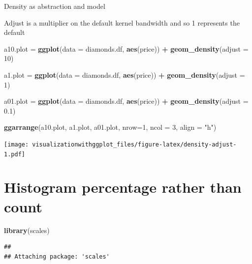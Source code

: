 \documentclass[]{krantz}
\makeatletter
\newenvironment{Shaded}{\begin{snugshade}}{\end{snugshade}}
\newcommand{\DataTypeTok}[1]{\textcolor[rgb]{0.13,0.29,0.53}{#1}}
\newcommand{\DecValTok}[1]{\textcolor[rgb]{0.00,0.00,0.81}{#1}}
\newcommand{\FloatTok}[1]{\textcolor[rgb]{0.00,0.00,0.81}{#1}}
\newcommand{\KeywordTok}[1]{\textcolor[rgb]{0.13,0.29,0.53}{\textbf{#1}}}
\newcommand{\NormalTok}[1]{#1}
\newcommand{\OperatorTok}[1]{\textcolor[rgb]{0.81,0.36,0.00}{\textbf{#1}}}
\newcommand{\StringTok}[1]{\textcolor[rgb]{0.31,0.60,0.02}{#1}}
\newenvironment{kframe}{%
\medskip{}
\setlength{\fboxsep}{.8em}
 \def\at@end@of@kframe{}%
 \ifinner\ifhmode%
  \def\at@end@of@kframe{\end{minipage}}%
  \begin{minipage}{\columnwidth}%
 \fi\fi%
 \def\FrameCommand##1{\hskip\@totalleftmargin \hskip-\fboxsep
 \colorbox{shadecolor}{##1}\hskip-\fboxsep
     \hskip-\linewidth \hskip-\@totalleftmargin \hskip\columnwidth}%
 \MakeFramed {\advance\hsize-\width
   \@totalleftmargin\z@ \linewidth\hsize
   \@setminipage}}%
 {\par\unskip\endMakeFramed%
 \at@end@of@kframe}
\renewenvironment{Shaded}{\begin{kframe}}{\end{kframe}}
\makeatother
\begin{document}
Density as abstraction and model

Adjust is a multiplier on the default kernel bandwidth and so 1 represents the default

\begin{Shaded}
\begin{Highlighting}[]
\NormalTok{a10.plot =}\StringTok{ }\KeywordTok{ggplot}\NormalTok{(}\DataTypeTok{data =}\NormalTok{ diamonds.df, }\KeywordTok{aes}\NormalTok{(price)) }\OperatorTok{+}\StringTok{ }
\StringTok{  }\KeywordTok{geom_density}\NormalTok{(}\DataTypeTok{adjust =} \DecValTok{10}\NormalTok{) }

\NormalTok{a1.plot =}\StringTok{ }\KeywordTok{ggplot}\NormalTok{(}\DataTypeTok{data =}\NormalTok{ diamonds.df, }\KeywordTok{aes}\NormalTok{(price)) }\OperatorTok{+}\StringTok{ }
\StringTok{  }\KeywordTok{geom_density}\NormalTok{(}\DataTypeTok{adjust =} \DecValTok{1}\NormalTok{) }

\NormalTok{a01.plot =}\StringTok{ }\KeywordTok{ggplot}\NormalTok{(}\DataTypeTok{data =}\NormalTok{ diamonds.df, }\KeywordTok{aes}\NormalTok{(price)) }\OperatorTok{+}\StringTok{ }
\StringTok{  }\KeywordTok{geom_density}\NormalTok{(}\DataTypeTok{adjust  =} \FloatTok{0.1}\NormalTok{) }

\KeywordTok{ggarrange}\NormalTok{(a10.plot, a1.plot, a01.plot,}
    \DataTypeTok{nrow=}\DecValTok{1}\NormalTok{, }\DataTypeTok{ncol =} \DecValTok{3}\NormalTok{, }\DataTypeTok{align =} \StringTok{"h"}\NormalTok{)}
\end{Highlighting}
\end{Shaded}

\texttt{[image: visualizationwithggplot\_files/figure-latex/density-adjust-1.pdf]}

\hypertarget{histogram-percentage-rather-than-count}{%
\section{Histogram percentage rather than count}\label{histogram-percentage-rather-than-count}}

\begin{Shaded}
\begin{Highlighting}[]
\KeywordTok{library}\NormalTok{(scales)}
\end{Highlighting}
\end{Shaded}

\begin{verbatim}
## 
## Attaching package: 'scales'
\end{verbatim}
\end{document}
